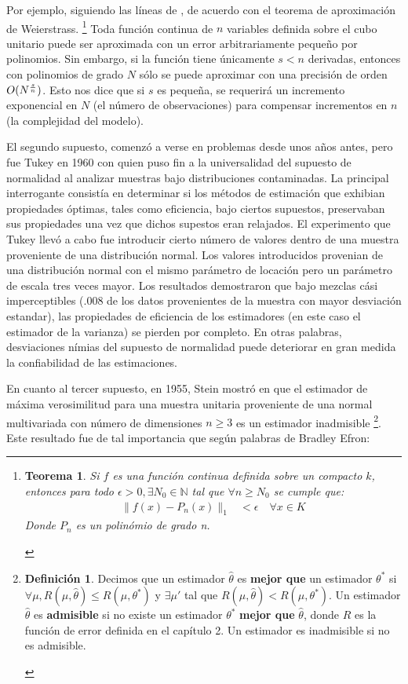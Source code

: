 \documentclass{book}
\theoremstyle{plain}
\newtheorem{thm}{Teorema}[section]
\theoremstyle{definition}
\newtheorem{defn}{Definición}[section]
\theoremstyle{remark}
\begin{document}
Por ejemplo, siguiendo las líneas de \cite{VAPNIK1}, de acuerdo con el teorema de aproximación de Weierstrass. \footnote{\begin{thm}Si $f$ es una función continua definida sobre un compacto $k$, entonces para todo $\epsilon > 0, \exists N_0\in\mathbb{N}$ tal que $\forall n\geq N_0$ se cumple que:
\begin{equation*}
  \begin{split}
    \|f(x) - P_n(x)\|_1 &< \epsilon\quad\forall x\in K
  \end{split}
\end{equation*}
Donde $P_n$ es un polinómio de grado n.
\end{thm}} Toda función continua de $n$ variables definida sobre el cubo unitario puede ser aproximada con un error arbitrariamente pequeño por polinomios. Sin embargo, si la función tiene únicamente $s<n$ derivadas, entonces con polinomios de grado $N$ sólo se puede aproximar con una precisión de orden $\large{O}(N^{\frac{s}{n}})$. Esto nos dice que si $s$ es pequeña, se requerirá un incremento exponencial en $N$ (el número de observaciones) para compensar incrementos en $n$ (la complejidad del modelo).

El segundo supuesto, comenzó a verse en problemas desde unos años antes, pero fue Tukey en 1960 con\cite{TUKEY} quien puso fin a la universalidad del supuesto de normalidad al analizar muestras bajo distribuciones contaminadas. La principal interrogante consistía en determinar si los métodos de estimación que exhibian propiedades óptimas, tales como eficiencia,  bajo ciertos supuestos, preservaban sus propiedades una vez que dichos supestos eran relajados. El experimento que Tukey llevó a cabo fue introducir cierto número de valores dentro de una muestra proveniente de una distribución normal. Los valores introducidos provenian de una distribución normal con el mismo parámetro de locación pero un parámetro de escala tres veces mayor. Los resultados demostraron que bajo mezclas cási imperceptibles (.008 de los datos provenientes de la muestra con mayor desviación estandar), las propiedades de eficiencia de los estimadores (en este caso el estimador de la varianza) se pierden por completo. En otras palabras, desviaciones nímias del supuesto de normalidad puede deteriorar en gran medida la confiabilidad de las estimaciones.  

En cuanto al tercer supuesto, en 1955, Stein mostró en \cite{STEIN1} que el estimador de máxima verosimilitud para una muestra unitaria proveniente de una normal multivariada con número de dimensiones $n\geq 3$ es un estimador inadmisible \footnote{\begin{defn}Decimos que un estimador $\hat{\theta}$ es \textbf{mejor que} un estimador $\theta^*$ si $\forall\mu,R(\mu,\hat{\theta})\leq R(\mu,\theta^*)$ y $\exists\mu'$ tal que $R(\mu,\hat{\theta})<R(\mu,\theta^*)$. Un estimador $\hat{\theta}$ es \textbf{admisible} si no existe un estimador $\theta^*$ \textbf{mejor que} $\hat{\theta}$, donde $R$ es la función de error definida en el capítulo 2. Un estimador es inadmisible si no es admisible.\end{defn}}. Este resultado fue de tal importancia que según palabras de Bradley Efron:
\end{document}

